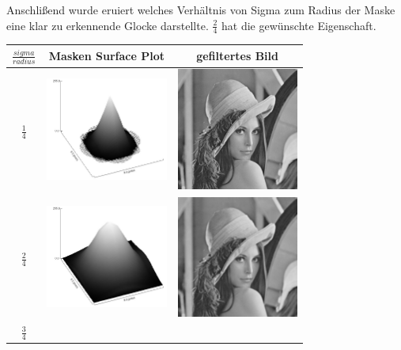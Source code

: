 \documentclass[12pt,german]{article}
\begin{document}
Anschlißend wurde eruiert welches Verhältnis von Sigma zum Radius der Maske eine klar zu erkennende Glocke darstellte. $ \frac{2}{4} $ hat die gewünschte Eigenschaft. 
\begin{table}[h]
  \centering
  \begin{tabular}{| c | c | c |}
    \hline
    $ \frac{sigma}{radius} $ & Masken Surface Plot & gefiltertes Bild \\
    \hline
    $ \frac{1}{4} $ &
	\includegraphics[width=4cm]{../testData/Gauss/GaussBellR4S1.jpg} & 	\includegraphics[width=4cm]{../testData/Gauss/LenaR4S1.jpg} \\
	    \hline
    $ \frac{2}{4} $ &
	\includegraphics[width=4cm]{../testData/Gauss/GaussBellR4S2.jpg} & 	\includegraphics[width=4cm]{../testData/Gauss/LenaR4S2.jpg} \\
	    \hline
    $ \frac{3}{4} $ &

\end{tabular}
\end{table}
\end{document}
